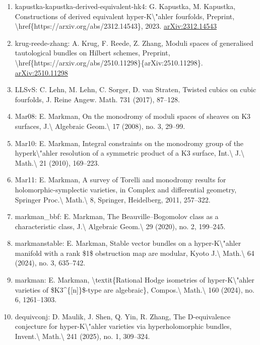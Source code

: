 \documentclass[11pt]{article}
\begin{document}
\begin{enumerate}[leftmargin=*]
  \item kapustka-kapustka-derived-equivalent-hk4: G. Kapustka, M. Kapustka, Constructions of derived equivalent hyper-K\textbackslash{}"ahler fourfolds, Preprint, \textbackslash{}href\{https://arxiv.org/abs/2312.14543\}, 2023. \href{https://arxiv.org/abs/2312.14543}{arXiv:2312.14543}
  \item krug-reede-zhang: A. Krug, F. Reede, Z. Zhang, Moduli spaces of generalised tautological bundles on Hilbert schemes, Preprint, \textbackslash{}href\{https://arxiv.org/abs/2510.11298\}\{arXiv:2510.11298\}. \href{https://arxiv.org/abs/2510.11298}{arXiv:2510.11298}
  \item LLSvS: C. Lehn, M. Lehn, C. Sorger, D. van Straten, Twisted cubics on cubic fourfolds, J. Reine Angew. Math. 731 (2017), 87--128.
  \item Mar08: E. Markman, On the monodromy of moduli spaces of sheaves on K3 surfaces, J.\textbackslash{} Algebraic Geom.\textbackslash{} 17 (2008), no. 3, 29--99.
  \item Mar10: E. Markman, Integral constraints on the monodromy group of the hyperk\textbackslash{}"ahler resolution of a symmetric product of a K3 surface, Int.\textbackslash{} J.\textbackslash{} Math.\textbackslash{} 21 (2010), 169--223.
  \item Mar11: E. Markman, A survey of Torelli and monodromy results for holomorphic-symplectic varieties, in Complex and differential geometry, Springer Proc.\textbackslash{} Math.\textbackslash{} 8, Springer, Heidelberg, 2011, 257--322.
  \item markman\_bbf: E. Markman, The Beauville--Bogomolov class as a characteristic class, J.\textbackslash{} Algebraic Geom.\textbackslash{} 29 (2020), no. 2, 199--245.
  \item markmanstable: E. Markman, Stable vector bundles on a hyper-K\textbackslash{}"ahler manifold with a rank \$1\$ obstruction map are modular, Kyoto J.\textbackslash{} Math.\textbackslash{} 64 (2024), no. 3, 635--742.
  \item markman: E. Markman, \textbackslash{}textit\{Rational Hodge isometries of hyper-K\textbackslash{}"ahler varieties of \$K3\^{}\{[n]\}\$-type are algebraic\}, Compos.\textbackslash{} Math.\textbackslash{} 160 (2024), no. 6, 1261--1303.
  \item dequivconj: D. Maulik, J. Shen, Q. Yin, R. Zhang, The D-equivalence conjecture for hyper-K\textbackslash{}"ahler varieties via hyperholomorphic bundles, Invent.\textbackslash{} Math.\textbackslash{} 241 (2025), no. 1, 309--324.

\end{enumerate}
\end{document}
